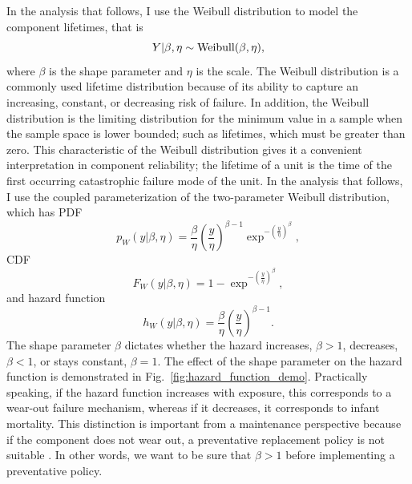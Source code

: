 In the analysis that follows, I use the Weibull distribution to model the component lifetimes, that is
\begin{equation}
    Y|\beta, \eta \sim \hbox{Weibull}(\beta, \eta),
\end{equation}
where $\beta$ is the shape parameter and $\eta$ is the scale. The Weibull distribution is a commonly used lifetime distribution because of its ability to capture an increasing, constant, or decreasing risk of failure. In addition, the Weibull distribution is the limiting distribution for the minimum value in a sample when the sample space is lower bounded; such as lifetimes, which must be greater than zero. This characteristic of the Weibull distribution gives it a convenient interpretation in component reliability; the lifetime of a unit is the time of the first occurring catastrophic failure mode of the unit. In the analysis that follows, I use the coupled parameterization of the two-parameter Weibull distribution, which has PDF
\begin{equation}
    p_{W}(y|\beta, \eta) = \frac{\beta}{\eta}\left(\frac{y}{\eta}\right)^{\beta - 1} \exp^{-\left(\frac{y}{\eta}\right)^{\beta}},
\end{equation}
CDF
\begin{equation}
    F_{W}(y|\beta, \eta) = 1 - \exp^{-\left(\frac{y}{\eta}\right)^{\beta}},
\end{equation}
and hazard function
\begin{equation}
    h_{W}(y|\beta, \eta) = \frac{\beta}{\eta}\left(\frac{y}{\eta}\right)^{\beta - 1}.
\end{equation}
The shape parameter $\beta$ dictates whether the hazard increases, $\beta > 1$, decreases, $\beta < 1$, or stays constant, $\beta = 1$. The effect of the shape parameter on the hazard function is demonstrated in Fig.~\ref{fig:hazard_function_demo}. Practically speaking, if the hazard function increases with exposure, this corresponds to a wear-out failure mechanism, whereas if it decreases, it corresponds to infant mortality. This distinction is important from a maintenance perspective because if the component does not wear out, a preventative replacement policy is not suitable \citep{jardine2013}. In other words, we want to be sure that $\beta > 1$ before implementing a preventative policy.


